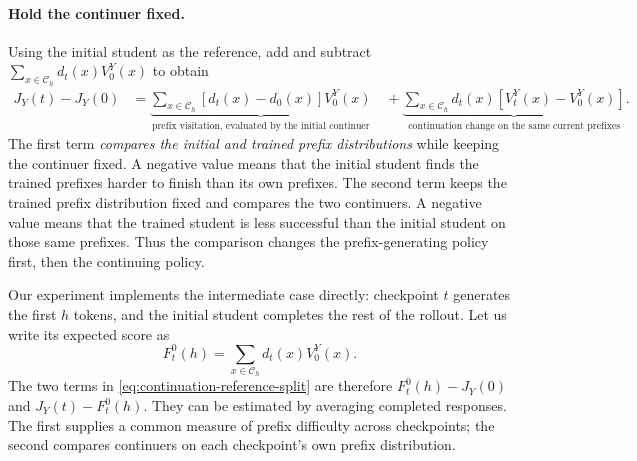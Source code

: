 \paragraph{Hold the continuer fixed.}
Using the initial student as the reference, add and subtract $\sum_{x\in\mathcal C_h}d_t(x)V_0^Y(x)$ to obtain
\begin{equation}
 \begin{aligned}
 J_Y(t)-J_Y(0)
 &=\underbrace{\sum_{x\in\mathcal C_h}[d_t(x)-d_0(x)]V_0^Y(x)}_{\text{prefix visitation, evaluated by the initial continuer}}
 \quad+\underbrace{\sum_{x\in\mathcal C_h}d_t(x)[V_t^Y(x)-V_0^Y(x)]}_{\text{continuation change on the same current prefixes}}.
 \end{aligned}
 \label{eq:continuation-reference-split}
\end{equation}
The first term \emph{compares the initial and trained prefix distributions} while keeping the continuer fixed. A negative value means that the initial student finds the trained prefixes harder to finish than its own prefixes. The second term keeps the trained prefix distribution fixed and compares the two continuers. A negative value means that the trained student is less successful than the initial student on those same prefixes. Thus the comparison changes the prefix-generating policy first, then the continuing policy.

Our experiment implements the intermediate case directly: checkpoint $t$ generates the first $h$ tokens, and the initial student completes the rest of the rollout. Let us write its expected score as
\begin{equation}
 F_t^0(h)=\sum_{x\in\mathcal C_h}d_t(x)V_0^Y(x).
 \label{eq:continuation-handoff}
\end{equation}
The two terms in \cref{eq:continuation-reference-split} are therefore $F_t^0(h)-J_Y(0)$ and $J_Y(t)-F_t^0(h)$. They can be estimated by averaging completed responses. The first supplies a common measure of prefix difficulty across checkpoints; the second compares continuers on each checkpoint's own prefix distribution. 

